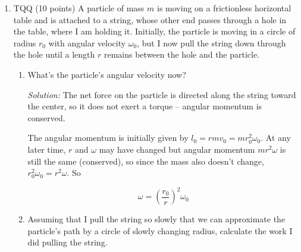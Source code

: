 \documentclass[12pt]{article}
\newcommand{\soln}[2] {\textit{Solution:} #2}
\begin{document}
\begin{enumerate}
          \soln{15em}{
              Since this is a (sort of) collision, angular momentum is conserved for the system of merry-go-round and Sarah. The initial angular momentum is Sarah's angular momentum -- who runs in a straight line, but as we've seen in a previous activity, straight line motion does have (constant) angular momentum $mv$ times distance of closest approach, so
              $$L_i = mvR$$
              Afterwards, both Sarah and the merry-go-round are rotating at $\omega_f$:
              $$L_f = \left(\frac{1}{2}MR^2 + mR^2\right)\omega_f$$

              (Note that I used the moment of inertia for a point mass for Sarah -- but I could have also written her angular momentum as $mv_fR = m(R\omega_f)R = mR^2\omega_f$, which gives the same contribution.)

              Setting $L_i = L_f$ and solving for $\omega_f$:
              $$
                  \omega_f = \frac{mvR}{(\frac{1}{2}MR^2 + mR^2)}
              $$
          }

          \clearpage
    \item TQQ (10 points) A particle of mass $m$ is moving on a frictionless horizontal table and is attached to a string, whose other end passes through a hole in the table, where I am holding it. Initially, the particle is moving in a circle of radius $r_0$ with angular velocity $\omega_0$, but I now pull the string down through the hole until a length $r$ remains between the hole and the particle.

          \begin{enumerate}
              \item What's the particle's angular velocity now?

                    \soln{10em}{
                        The net force on the particle is directed along the string toward the center, so it does not exert a torque -- angular momentum is conserved.

                        The angular momentum is initially given by $l_0 = rmv_0 = mr_0^2\omega_0$. At any later time, $r$ and $\omega$ may have changed but angular momentum $mr^2\omega$ is still the same (conserved), so since the mass also doesn't change, $r_0^2\omega_0 = r^2\omega$. So

                        $$\omega = \left(\frac{r_0}{r}\right)^2 \omega_0$$
                    }

              \item Assuming that I pull the string so slowly that we can approximate the particle's path by a circle of slowly changing radius, calculate the work I did pulling the string.


\end{enumerate}
\end{enumerate}
\end{document}
